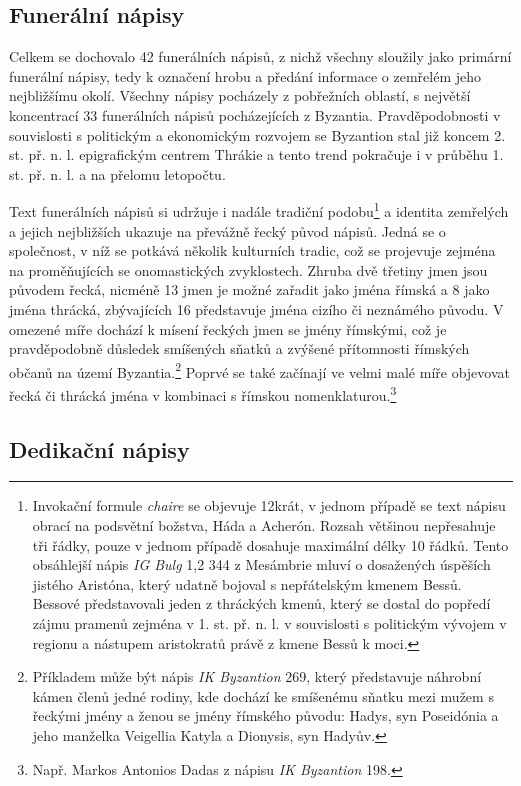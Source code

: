 \subsection[funerální-nápisy-9]{Funerální nápisy}

Celkem se dochovalo 42 funerálních nápisů, z nichž všechny sloužily jako primární funerální nápisy, tedy k označení hrobu a předání informace o zemřelém jeho nejbližšímu okolí. Všechny nápisy pocházely z pobřežních oblastí, s největší koncentrací 33 funerálních nápisů pocházejících z Byzantia. Pravděpodobnosti v souvislosti s politickým a ekonomickým rozvojem se Byzantion stal již koncem 2. st. př. n. l. epigrafickým centrem Thrákie a tento trend pokračuje i v průběhu 1. st. př. n. l. a na přelomu letopočtu.

Text funerálních nápisů si udržuje i nadále tradiční podobu\footnote{Invokační formule {\em chaire} se objevuje 12krát, v jednom případě se text nápisu obrací na podsvětní božstva, Háda a Acherón. Rozsah většinou nepřesahuje tři řádky, pouze v jednom případě dosahuje maximální délky 10 řádků. Tento obsáhlejší nápis {\em IG Bulg} 1,2 344 z Mesámbrie mluví o dosažených úspěších jistého Aristóna, který udatně bojoval s nepřátelským kmenem Bessů. Bessové představovali jeden z thráckých kmenů, který se dostal do popředí zájmu pramenů zejména v 1. st. př. n. l. v souvislosti s politickým vývojem v regionu a nástupem aristokratů právě z kmene Bessů k moci.} a identita zemřelých a jejich nejbližších ukazuje na převážně řecký původ nápisů. Jedná se o společnost, v níž se potkává několik kulturních tradic, což se projevuje zejména na proměňujících se onomastických zvyklostech. Zhruba dvě třetiny jmen jsou původem řecká, nicméně 13  jmen je možné zařadit jako jména římská a 8  jako jména thrácká, zbývajících 16  představuje jména cizího či neznámého původu. V omezené míře dochází k mísení řeckých jmen se jmény římskými, což je pravděpodobně důsledek smíšených sňatků a zvýšené přítomnosti římských občanů na území Byzantia.\footnote{Příkladem může být nápis {\em IK Byzantion} 269, který představuje náhrobní kámen členů jedné rodiny, kde dochází ke smíšenému sňatku mezi mužem s řeckými jmény a ženou se jmény římského původu: Hadys, syn Poseidónia a jeho manželka Veigellia Katyla a Dionysis, syn Hadyův.} Poprvé se také začínají ve velmi malé míře objevovat řecká či thrácká jména v kombinaci s římskou nomenklaturou.\footnote{Např. Markos Antonios Dadas z nápisu {\em IK Byzantion} 198.}

\subsection[dedikační-nápisy-9]{Dedikační nápisy}

